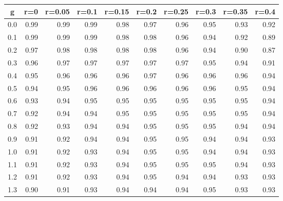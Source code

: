 %
\begin{table}[!tbp]
 \begin{center}
 \begin{tabular}{rrrrrrrrrr}\hline\hline
\multicolumn{1}{c}{g}&\multicolumn{1}{c}{r=0}&\multicolumn{1}{c}{r=0.05}&\multicolumn{1}{c}{r=0.1}&\multicolumn{1}{c}{r=0.15}&\multicolumn{1}{c}{r=0.2}&\multicolumn{1}{c}{r=0.25}&\multicolumn{1}{c}{r=0.3}&\multicolumn{1}{c}{r=0.35}&\multicolumn{1}{c}{r=0.4}\tabularnewline
\hline
0.0&0.99&0.99&0.99&0.98&0.97&0.96&0.95&0.93&0.92\tabularnewline
0.1&0.99&0.99&0.99&0.98&0.98&0.96&0.94&0.92&0.89\tabularnewline
0.2&0.97&0.98&0.98&0.98&0.98&0.96&0.94&0.90&0.87\tabularnewline
0.3&0.96&0.97&0.97&0.97&0.97&0.97&0.95&0.94&0.91\tabularnewline
0.4&0.95&0.96&0.96&0.96&0.97&0.96&0.96&0.96&0.94\tabularnewline
0.5&0.94&0.95&0.96&0.96&0.96&0.96&0.96&0.95&0.94\tabularnewline
0.6&0.93&0.94&0.95&0.95&0.95&0.95&0.95&0.95&0.94\tabularnewline
0.7&0.92&0.94&0.94&0.95&0.95&0.95&0.95&0.95&0.94\tabularnewline
0.8&0.92&0.93&0.94&0.94&0.95&0.95&0.95&0.94&0.94\tabularnewline
0.9&0.91&0.92&0.94&0.94&0.95&0.95&0.94&0.94&0.93\tabularnewline
1.0&0.91&0.92&0.93&0.94&0.95&0.95&0.94&0.94&0.93\tabularnewline
1.1&0.91&0.92&0.93&0.94&0.95&0.95&0.95&0.94&0.93\tabularnewline
1.2&0.91&0.92&0.93&0.94&0.95&0.94&0.94&0.93&0.93\tabularnewline
1.3&0.90&0.91&0.93&0.94&0.94&0.94&0.95&0.93&0.93\tabularnewline
\hline
\end{tabular}

\end{center}

\end{table}

